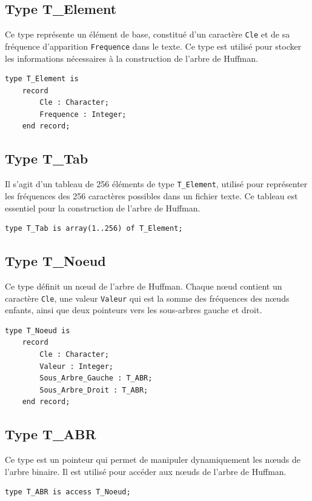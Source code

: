 \documentclass[12pt,a4paper]{article}
\begin{document}
\subsection{Type T\_Element}
Ce type représente un élément de base, constitué d'un caractère \texttt{Cle} et de sa fréquence d'apparition \texttt{Frequence} dans le texte. Ce type est utilisé pour stocker les informations nécessaires à la construction de l'arbre de Huffman.

\begin{verbatim}
type T_Element is
    record
        Cle : Character;
        Frequence : Integer;
    end record;
\end{verbatim}


\subsection{Type T\_Tab}
Il s'agit d'un tableau de 256 éléments de type \texttt{T\_Element}, utilisé pour représenter les fréquences des 256 caractères possibles dans un fichier texte. Ce tableau est essentiel pour la construction de l'arbre de Huffman.

\begin{verbatim}
type T_Tab is array(1..256) of T_Element;
\end{verbatim}

\subsection{Type T\_Noeud}
Ce type définit un nœud de l'arbre de Huffman. Chaque nœud contient un caractère \texttt{Cle}, une valeur \texttt{Valeur} qui est la somme des fréquences des nœuds enfants, ainsi que deux pointeurs vers les sous-arbres gauche et droit.

\begin{verbatim}
type T_Noeud is
    record
        Cle : Character;
        Valeur : Integer;
        Sous_Arbre_Gauche : T_ABR;
        Sous_Arbre_Droit : T_ABR;
    end record;
\end{verbatim}

\subsection{Type T\_ABR}
Ce type est un pointeur qui permet de manipuler dynamiquement les nœuds de l'arbre binaire. Il est utilisé pour accéder aux nœuds de l'arbre de Huffman.

\begin{verbatim}
type T_ABR is access T_Noeud;
\end{verbatim}
\end{document}
